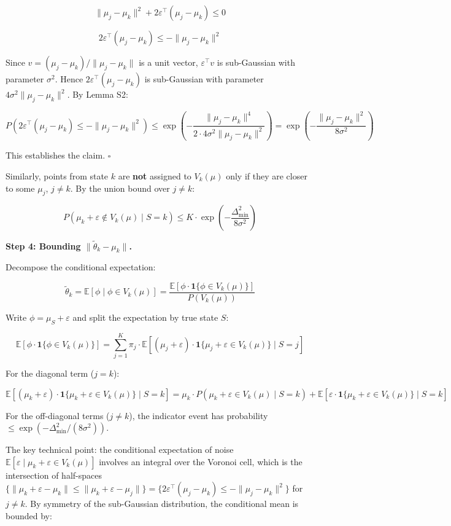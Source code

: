 \documentclass[
  12pt,
]{article}
\begin{document}
\[\|\mu_j - \mu_k\|^2 + 2\varepsilon^\top(\mu_j - \mu_k) \leq 0\]

\[2\varepsilon^\top(\mu_j - \mu_k) \leq -\|\mu_j - \mu_k\|^2\]

Since \(v = (\mu_j - \mu_k)/\|\mu_j - \mu_k\|\) is a unit vector,
\(\varepsilon^\top v\) is sub-Gaussian with parameter \(\sigma^2\).
Hence \(2\varepsilon^\top(\mu_j - \mu_k)\) is sub-Gaussian with
parameter \(4\sigma^2\|\mu_j - \mu_k\|^2\). By Lemma S2:

\[P\left(2\varepsilon^\top(\mu_j - \mu_k) \leq -\|\mu_j - \mu_k\|^2\right) \leq \exp\left(-\frac{\|\mu_j - \mu_k\|^4}{2 \cdot 4\sigma^2 \|\mu_j - \mu_k\|^2}\right) = \exp\left(-\frac{\|\mu_j - \mu_k\|^2}{8\sigma^2}\right)\]

This establishes the claim. \(\square\)

Similarly, points from state \(k\) are \textbf{not} assigned to
\(V_k(\mu)\) only if they are closer to some \(\mu_j\), \(j \neq k\). By
the union bound over \(j \neq k\):

\[P(\mu_k + \varepsilon \notin V_k(\mu) \mid S=k) \leq K \cdot \exp\left(-\frac{\Delta_{\min}^2}{8\sigma^2}\right)\]

\textbf{Step 4: Bounding \(\|\tilde{\theta}_k - \mu_k\|\).}

Decompose the conditional expectation:

\[\tilde{\theta}_k = \mathbb{E}[\phi \mid \phi \in V_k(\mu)] = \frac{\mathbb{E}[\phi \cdot \mathbf{1}\{\phi \in V_k(\mu)\}]}{P(V_k(\mu))}\]

Write \(\phi = \mu_S + \varepsilon\) and split the expectation by true
state \(S\):

\[\mathbb{E}[\phi \cdot \mathbf{1}\{\phi \in V_k(\mu)\}] = \sum_{j=1}^K \pi_j \cdot \mathbb{E}\left[ (\mu_j + \varepsilon) \cdot \mathbf{1}\{\mu_j + \varepsilon \in V_k(\mu)\} \mid S=j \right]\]

For the diagonal term (\(j=k\)):

\[\mathbb{E}\left[ (\mu_k + \varepsilon) \cdot \mathbf{1}\{\mu_k + \varepsilon \in V_k(\mu)\} \mid S=k \right] = \mu_k \cdot P(\mu_k + \varepsilon \in V_k(\mu) \mid S=k) + \mathbb{E}\left[ \varepsilon \cdot \mathbf{1}\{\mu_k + \varepsilon \in V_k(\mu)\} \mid S=k \right]\]

For the off-diagonal terms (\(j \neq k\)), the indicator event has
probability \(\leq \exp(-\Delta_{\min}^2/(8\sigma^2))\).

The key technical point: the conditional expectation of noise
\(\mathbb{E}[\varepsilon \mid \mu_k + \varepsilon \in V_k(\mu)]\)
involves an integral over the Voronoi cell, which is the intersection of
half-spaces
\(\{\|\mu_k + \varepsilon - \mu_k\| \leq \|\mu_k + \varepsilon - \mu_j\|\} = \{2\varepsilon^\top(\mu_j - \mu_k) \leq -\|\mu_j - \mu_k\|^2\}\)
for \(j \neq k\). By symmetry of the sub-Gaussian distribution, the
conditional mean is bounded by:
\end{document}
